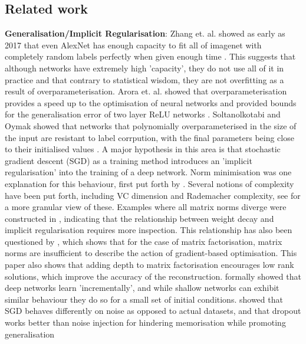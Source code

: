 \documentclass{article}
\begin{document}
        \subsection{Related work}
            \indent \textbf{Generalisation/Implicit Regularisation}: Zhang et. al. showed as early as 2017 that even AlexNet has enough capacity to fit all of imagenet with completely random labels perfectly when given enough time \cite{zhang2017understandingdeeplearningrequires}. This suggests that although networks have extremely high 'capacity', they do not use all of it in practice and that contrary to statistical wisdom, they are not overfitting as a result of overparameterisation. Arora et. al. showed that overparameterisation provides a speed up to the optimisation of neural networks and provided bounds for the generalisation error of two layer ReLU networks \cite{pmlr-v80-arora18a}. Soltanolkotabi and Oymak showed that networks that polynomially overparameterised in the size of the input are resistant to label corrpution, with the final parameters being close to their initialised values \cite{pmlr-v108-li20j}. A major hypothesis in this area is that stochastic gradient descent (SGD) as a training method introduces an 'implicit regularisation' into the training of a deep network. Norm minimisation was one explanation for this behaviour, first put forth by \cite{neyshabur2015searchrealinductivebias}. Several notions of complexity have been put forth, including VC dimension and Rademacher complexity, see \cite{neyshabur2017implicitregularizationdeeplearning} for a more granular view of these. Examples where all matrix norms diverge were constructed in \cite{razin2020implicitregularizationdeeplearning}, indicating that the relationship between weight decay and implicit regularisation requires more inspection. This relationship has also been questioned by \cite{arora2019implicitregularizationdeepmatrix}, which shows that for the case of matrix factorisation, matrix norms are insufficient to describe the action of gradient-based optimisation. This paper also shows that adding depth to matrix factorisation encourages low rank solutions, which improve the accuracy of the reconstruction. \cite{gissin2019implicitbiasdepthincremental} formally showed that deep networks learn 'incrementally', and while shallow networks can exhibit similar behaviour they do so for a small set of initial conditions. \cite{arpit2017closerlookmemorizationdeep} showed that SGD behaves differently on noise as opposed to actual datasets, and that dropout works better than noise injection for hindering memorisation while promoting generalisation
\end{document}
